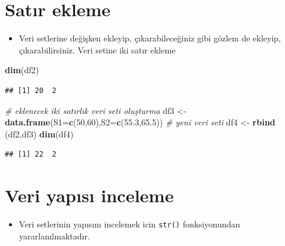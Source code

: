 \documentclass[
  oneside]{book}
\newenvironment{Shaded}{\begin{snugshade}}{\end{snugshade}}
\newcommand{\AttributeTok}[1]{\textcolor[rgb]{0.13,0.29,0.53}{#1}}
\newcommand{\CommentTok}[1]{\textcolor[rgb]{0.56,0.35,0.01}{\textit{#1}}}
\newcommand{\DecValTok}[1]{\textcolor[rgb]{0.00,0.00,0.81}{#1}}
\newcommand{\FloatTok}[1]{\textcolor[rgb]{0.00,0.00,0.81}{#1}}
\newcommand{\FunctionTok}[1]{\textcolor[rgb]{0.13,0.29,0.53}{\textbf{#1}}}
\newcommand{\NormalTok}[1]{#1}
\newcommand{\OtherTok}[1]{\textcolor[rgb]{0.56,0.35,0.01}{#1}}
\providecommand{\tightlist}{%
  \setlength{\itemsep}{0pt}\setlength{\parskip}{0pt}}
\begin{document}
\hypertarget{satux131r-ekleme}{%
\section{Satır ekleme}\label{satux131r-ekleme}}

\begin{itemize}
\tightlist
\item
  Veri setlerine değişken ekleyip, çıkarabileceğiniz gibi gözlem de ekleyip, çıkarabilirsiniz. Veri setine iki satır ekleme
\end{itemize}

\begin{Shaded}
\begin{Highlighting}[]
\FunctionTok{dim}\NormalTok{(df2)}
\end{Highlighting}
\end{Shaded}

\begin{verbatim}
## [1] 20  2
\end{verbatim}

\begin{Shaded}
\begin{Highlighting}[]
\CommentTok{\# eklenecek iki satırlık veri seti oluşturma}
\NormalTok{df3 }\OtherTok{\textless{}{-}} \FunctionTok{data.frame}\NormalTok{(}\AttributeTok{S1=}\FunctionTok{c}\NormalTok{(}\DecValTok{50}\NormalTok{,}\DecValTok{60}\NormalTok{),}\AttributeTok{S2=}\FunctionTok{c}\NormalTok{(}\FloatTok{55.3}\NormalTok{,}\FloatTok{65.5}\NormalTok{))}
\CommentTok{\# yeni veri seti}
\NormalTok{df4 }\OtherTok{\textless{}{-}} \FunctionTok{rbind}\NormalTok{ (df2,df3)}
\FunctionTok{dim}\NormalTok{(df4)}
\end{Highlighting}
\end{Shaded}

\begin{verbatim}
## [1] 22  2
\end{verbatim}

\hypertarget{veri-yapux131sux131-inceleme}{%
\section{Veri yapısı inceleme}\label{veri-yapux131sux131-inceleme}}

\begin{itemize}
\tightlist
\item
  Veri setlerinin yapısını incelemek icin \texttt{str()} fonksiyonundan yararlanılmaktadır.
\end{itemize}
\end{document}

